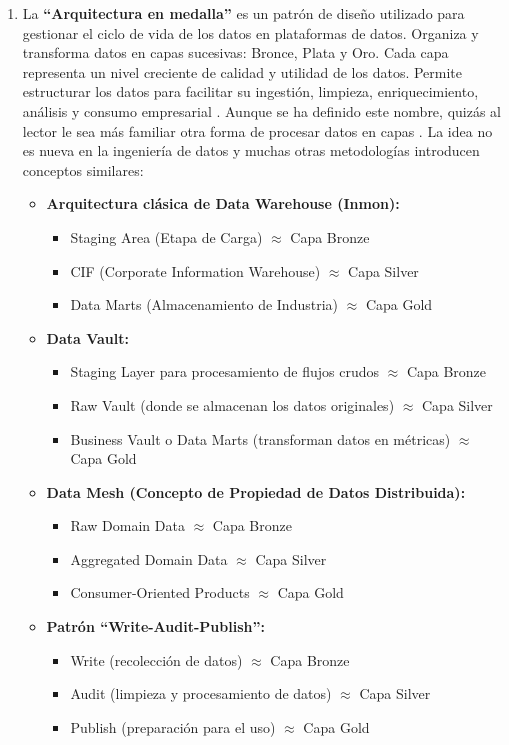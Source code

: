 \begin{enumerate}
	\item La \textbf{``Arquitectura en medalla''} \label{def11} es un patrón de diseño utilizado para gestionar el ciclo de vida de los datos en plataformas de datos. Organiza y transforma datos en capas sucesivas: Bronce, Plata y Oro. Cada capa representa un nivel creciente de calidad y utilidad de los datos. Permite estructurar los datos para facilitar su ingestión, limpieza, enriquecimiento, análisis y consumo empresarial \citep{MedallionMicrosoft}.
	Aunque se ha definido este nombre, quizás al lector le sea más familiar otra forma de procesar datos en capas \citep{MedallionMedium}. La idea no es nueva en la ingeniería de datos y muchas otras metodologías introducen conceptos similares:
	\begin{itemize}
		\item \textbf{Arquitectura clásica de Data Warehouse (Inmon):}
		\begin{itemize}
			\item Staging Area (Etapa de Carga) $\approx$ Capa Bronze
			\item CIF (Corporate Information Warehouse) $\approx$ Capa Silver
			\item Data Marts (Almacenamiento de Industria) $\approx$ Capa Gold
		\end{itemize}
		\item \textbf{Data Vault:}
		\begin{itemize}
			\item Staging Layer para procesamiento de flujos crudos $\approx$ Capa Bronze
			\item Raw Vault (donde se almacenan los datos originales) $\approx$ Capa Silver
			\item Business Vault o Data Marts (transforman datos en métricas) $\approx$ Capa Gold
		\end{itemize}
		\item \textbf{Data Mesh (Concepto de Propiedad de Datos Distribuida):}
		\begin{itemize}
			\item Raw Domain Data $\approx$ Capa Bronze
			\item Aggregated Domain Data $\approx$ Capa Silver
			\item Consumer-Oriented Products $\approx$ Capa Gold
		\end{itemize}
		\item \textbf{Patrón ``Write-Audit-Publish'':}
		\begin{itemize}
			\item Write (recolección de datos) $\approx$ Capa Bronze
			\item Audit (limpieza y procesamiento de datos) $\approx$ Capa Silver
			\item Publish (preparación para el uso) $\approx$ Capa Gold
		\end{itemize}
	\end{itemize}


\end{enumerate}
